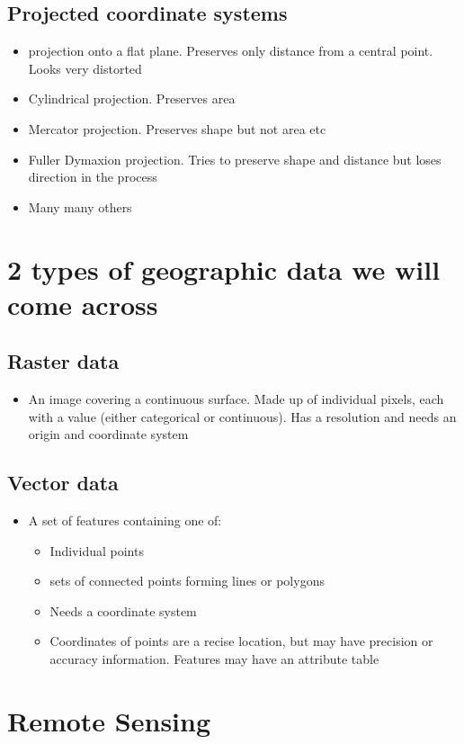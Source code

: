 \documentclass[11pt]{article}
\begin{document}
\subsection{Projected coordinate systems}
\begin{itemize}
\item projection onto a flat plane. Preserves only distance from a central point. Looks very distorted
\item Cylindrical projection. Preserves area 
\item Mercator projection. Preserves shape but not area etc
\item Fuller Dymaxion projection. Tries to preserve shape and distance but loses direction in the process
\item Many many others
\end{itemize}
\section{2 types of geographic data we will come across}
\subsection{Raster data}
\begin{itemize}
\item An image covering a continuous surface. Made up of individual pixels, each with a value (either categorical or continuous). Has a resolution and needs an origin and coordinate system
\end{itemize}
\subsection{Vector data}
\begin{itemize}
\item A set of features containing one of:
\indent \begin{itemize}
\item Individual points
\item sets of connected points forming lines or polygons
\item Needs a coordinate system 
\item Coordinates of points are a recise location, but may have precision or accuracy information. Features may have an attribute table
\end{itemize}
\end{itemize}
\bigskip
\section{Remote Sensing}
\end{document}

